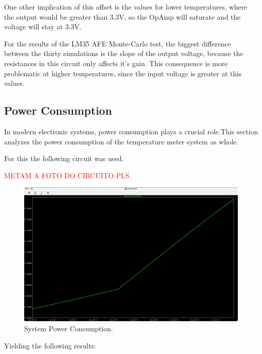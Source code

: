 \documentclass[12pt]{article}
\begin{document}
    One other implication of this offset is the values for lower temperatures, where the output would be greater than 3.3V, so the OpAmp will saturate and the voltage will stay at 3.3V.

    For the results of the LM35 AFE Monte-Carlo test, the biggest difference between the thirty simulations is the slope of the output voltage,
    because the resistances in this circuit only affects it's gain. This consequence is more problematic at higher temperatures, since the input voltage is greater at this values.

    \subsection{Power Consumption}
    
    In modern electronic systems, power consumption plays a crucial role.This section analyzes the power consumption of the temperature meter system as whole.

    For this the following circuit was used.

    \textcolor{red}{METAM A FOTO DO CIRCUITO PLS}
    \begin{figure}[H] 
        \centering
        \includegraphics*[scale = 0.15]{images/PowerConsumption.jpeg}
        \caption{System Power Consumption.}
        \label{wrap-fig:1}
    \end{figure}

    Yielding the following results: 
        
\end{document}
